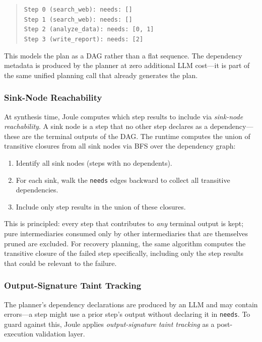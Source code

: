 \begin{quote}
\small
\texttt{Step 0 (search\_web): needs: []} \\
\texttt{Step 1 (search\_web): needs: []} \\
\texttt{Step 2 (analyze\_data): needs: [0, 1]} \\
\texttt{Step 3 (write\_report): needs: [2]}
\end{quote}

\noindent This models the plan as a DAG rather than a flat sequence. The dependency metadata is produced by the planner at zero additional LLM cost---it is part of the same unified planning call that already generates the plan.

\subsubsection{Sink-Node Reachability}

At synthesis time, Joule computes which step results to include via \emph{sink-node reachability}. A sink node is a step that no other step declares as a dependency---these are the terminal outputs of the DAG. The runtime computes the union of transitive closures from all sink nodes via BFS over the dependency graph:

\begin{enumerate}[leftmargin=2em,itemsep=2pt]
  \item Identify all sink nodes (steps with no dependents).
  \item For each sink, walk the \texttt{needs} edges backward to collect all transitive dependencies.
  \item Include only step results in the union of these closures.
\end{enumerate}

\noindent This is principled: every step that contributes to \emph{any} terminal output is kept; pure intermediaries consumed only by other intermediaries that are themselves pruned are excluded. For recovery planning, the same algorithm computes the transitive closure of the failed step specifically, including only the step results that could be relevant to the failure.

\subsubsection{Output-Signature Taint Tracking}

The planner's dependency declarations are produced by an LLM and may contain errors---a step might use a prior step's output without declaring it in \texttt{needs}. To guard against this, Joule applies \emph{output-signature taint tracking} as a post-execution validation layer.

